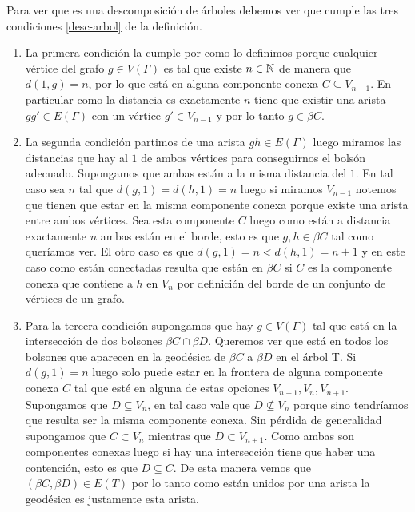 \documentclass[tesis.tex]{subfiles}
\begin{document}
\begin{ej}
	Para ver que es una descomposición de árboles debemos ver que cumple las tres condiciones \ref{desc-arbol} de la definición. 
	\begin{enumerate}
		\item La primera condición la cumple por como lo definimos porque cualquier vértice del grafo $g \in V(\Gamma)$ 
		es tal que existe $n \in \mathbb N$ de manera que $d(1,g)=n$, por lo que está en alguna componente conexa $C \subseteq V_{n-1}$. 
		En particular como la distancia es exactamente $n$ tiene que existir una arista $gg' \in E(\Gamma)$ con un vértice $g' \in V_{n-1}$ y por lo tanto $g \in \beta C$.
		
		\item La segunda condición partimos de una arista $gh \in E(\Gamma)$ luego miramos las distancias que hay al $1$ de ambos vértices para conseguirnos el bolsón adecuado. 
		Supongamos que ambas están a la misma distancia del $1$. En tal caso sea $n$ tal que $d(g,1)=d(h,1)=n$ luego si miramos $V_{n-1}$ notemos que tienen que estar en la misma componente conexa porque existe una arista entre ambos vértices. Sea esta componente $C$ luego como están a distancia exactamente $n$ ambas están en el borde, esto es que $g,h \in \beta C$ tal como queríamos ver. 
		El otro caso es que $d(g,1)=n < d(h,1)=n+1$ y en este caso como están conectadas resulta que están en $\beta C$ si $C$ es la componente conexa que contiene a $h$ en $V_n$ por definición del borde de un conjunto de vértices de un grafo.
		
		\item Para la tercera condición supongamos que hay $g \in V(\Gamma)$ tal que está en la intersección de dos bolsones $\beta C \cap \beta D$. 
		Queremos ver que está en todos los bolsones que aparecen en la geodésica de $\beta C$ a $\beta D$ en el árbol T. 
		Si $d(g,1) = n$ luego solo puede estar en la frontera de alguna componente conexa $C$ tal que esté en alguna de estas opciones  $V_{n-1}, V_{n},  V_{n+1}$. 
		Supongamos que $D \subseteq V_{n}$, en tal caso vale que $D \nsubseteq V_{n}$ porque sino tendríamos que resulta ser la misma componente conexa. 
		Sin pérdida de generalidad supongamos que $C \subset V_n$ mientras que $D \subset V_{n+1}$. 
		Como ambas son componentes conexas luego si hay una intersección tiene que haber una contención, esto es que $D \subseteq C$. 
		De esta manera vemos que $(\beta C, \beta D) \in E(T)$ por lo tanto como están unidos por una arista la geodésica es justamente esta arista.
		
	\end{enumerate}
\end{ej}
\end{document}
